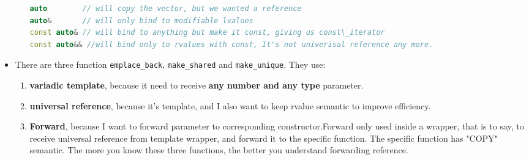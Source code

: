 \documentclass[a4paper,11pt,twoside]{book}
\begin{document}
\begin{itemize}
\begin{enumerate}
\begin{lstlisting}[frame=single, language=c++]
auto        // will copy the vector, but we wanted a reference
auto&       // will only bind to modifiable lvalues
const auto& // will bind to anything but make it const, giving us const\_iterator
const auto&& //will bind only to rvalues with const, It's not univerisal reference any more. 
\end{lstlisting} 
	\end{enumerate}

\item There are three function \texttt{emplace\_back}, \texttt{make\_shared} and \texttt{make\_unique}. They use:
	\begin{enumerate}
		\item \textbf{variadic template}, because it need to receive \textbf{any number and any type} parameter.

		\item \textbf{universal reference}, because it's template, and I also want to keep rvalue semantic to improve efficiency. 
		
		\item \textbf{Forward}, because I want to forward parameter to corresponding constructor.Forward only used inside a wrapper, that is to say, to receive universal reference from template wrapper, and forward it to the specific function. The specific function has "COPY" semantic. The more you know these three functions, the better you understand forwarding reference.
	\end{enumerate}
\end{itemize}
\end{document}

